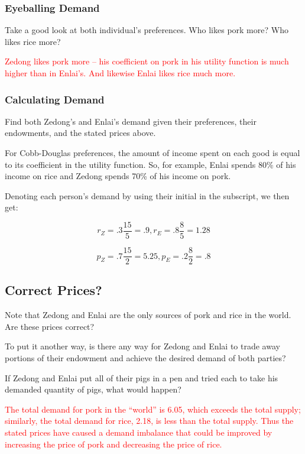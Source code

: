 \documentclass{article}
\begin{document}
\subsubsection{Eyeballing Demand}

Take a good look at both individual's preferences. Who likes pork more? Who likes rice more?

\textcolor{red}{Zedong likes pork more -- his coefficient on pork in his utility function is much higher than in Enlai's. And likewise Enlai likes rice much more.}

\subsubsection{Calculating Demand}

Find both Zedong's and Enlai's demand given their preferences, their endowments, and the stated prices above.

\color{red}

For Cobb-Douglas preferences, the amount of income spent on each good is equal to its coefficient in the utility function. So, for example, Enlai spends 80\% of his income on rice and Zedong spends 70\% of his income on pork.

Denoting each person's demand by using their initial in the subscript, we then get:

\[ r_Z = .3 \frac{15}5 = .9, r_E = .8 \frac85 = 1.28 \]

\[ p_Z = .7 \frac{15}2 = 5.25, p_E = .2 \frac82 = .8 \]

\color{black}

\subsection{Correct Prices?}

Note that Zedong and Enlai are the only sources of pork and rice in the world. Are these prices correct?

To put it another way, is there any way for Zedong and Enlai to trade away portions of their endowment and achieve the desired demand of both parties?

If Zedong and Enlai put all of their pigs in a pen and tried each to take his demanded quantity of pigs, what would happen?

\textcolor{red}{The total demand for pork in the ``world'' is 6.05, which exceeds the total supply; similarly, the total demand for rice, 2.18, is less than the total supply. Thus the stated prices have caused a demand imbalance that could be improved by increasing the price of pork and decreasing the price of rice.}
\end{document}
